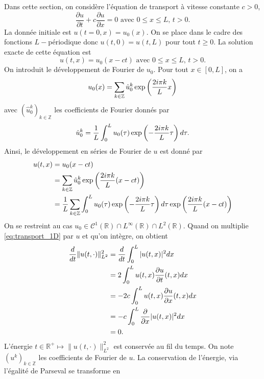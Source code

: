 Dans cette section, on considère l'équation de transport à vitesse constante $c>0$,
\begin{equation}
\dfrac{\partial u}{\partial t} + c \dfrac{\partial u}{\partial x} = 0 \text{ avec } 0 \leq x \leq L \text{, } t>0.
\label{eq:transport_1D}
\end{equation}
La donnée initiale est $u(t=0,x)=u_0(x)$. On se place dans le cadre des fonctions $L-$périodique donc $u(t,0)=u(t,L)$ pour tout $t \geq 0$. La solution exacte de cette équation est
\begin{equation}
u(t,x) = u_0(x-ct)  \text{ avec } 0 \leq x \leq L \text{, } t>0.
\end{equation}
On introduit le développement de Fourier de $u_0$. Pour tout $x \in [0,L]$, on a
\begin{equation}
u_0(x) = \displaystyle\sum\limits_{k \in \mathbb{Z}} \hat{u}_0^k \exp \left( \dfrac{2i \pi k}{L} x \right)
\end{equation}
avec $(\hat{u}_0^k)_{k \in \mathbb{Z}}$ les coefficients de Fourier donnés par
\begin{equation}
\hat{u}_0^k = \dfrac{1}{L} \displaystyle\int_0^L u_0(\tau)  \exp \left( -\dfrac{2i \pi k}{L} \tau \right) d \tau.
\end{equation}
Ainsi, le développement en séries de Fourier de $u$ est donné par
\begin{align}
u(t,x) & = u_0(x-ct)\\
	& = \displaystyle\sum\limits_{k \in \mathbb{Z}} \hat{u}_0^k \exp \left( \dfrac{2i \pi k}{L} (x-ct) \right) \\
	& = \dfrac{1}{L} \displaystyle\sum\limits_{k \in \mathbb{Z}} \displaystyle\int_0^L u_0(\tau)  \exp \left( -\dfrac{2i \pi k}{L} \tau \right) d \tau \exp \left( \dfrac{2i \pi k}{L} (x-ct) \right)
	\label{eq:trsp_fourier}
\end{align}
On se restreint au cas $u_0 \in \mathcal{C}^1(\mathbb{R}) \cap L^{\infty}(\mathbb{R}) \cap L^2(\mathbb{R})$. Quand on multiplie \eqref{eq:transport_1D} par $u$ et qu'on intègre, on obtient
\begin{align*}
\dfrac{d}{dt} \| u (t,\cdot) \|_{L^2}^2 & = \dfrac{d}{dt} \displaystyle\int_0^L |u(t,x)|^2 dx \\
	& = 2 \displaystyle\int_0^L u(t,x) \dfrac{\partial u}{\partial t}(t,x) dx \\
	& = - 2 c \displaystyle\int_0^L u(t,x) \dfrac{\partial u}{\partial x}(t,x) dx \\
	& = - c \displaystyle\int_0^L \dfrac{\partial}{\partial x} |u(t,x)|^2 dx \\
	& = 0.
\end{align*}
L'énergie $t \in \mathbb{R}^+ \mapsto  \| u (t,\cdot) \|_{L^2}^2$ est conservée au fil du temps. On note $(u^k)_{k \in \mathbb{Z}}$ les coefficients de Fourier de $u$. La conservation de l'énergie, via l'égalité de Parseval se transforme en
